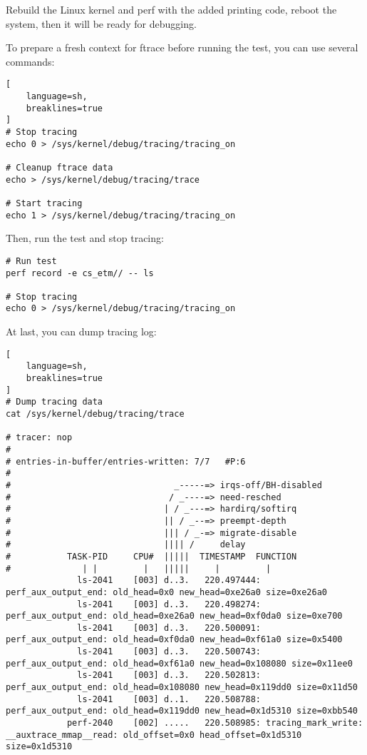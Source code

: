 \documentclass[11pt]{diazessay} %
\begin{document}
Rebuild the Linux kernel and perf with the added printing code, reboot the
system, then it will be ready for debugging.

To prepare a fresh context for ftrace before running the test, you can use
several commands:

\begin{lstlisting}[
  	language=sh,
	breaklines=true
]
# Stop tracing
echo 0 > /sys/kernel/debug/tracing/tracing_on

# Cleanup ftrace data
echo > /sys/kernel/debug/tracing/trace

# Start tracing
echo 1 > /sys/kernel/debug/tracing/tracing_on
\end{lstlisting}

Then, run the test and stop tracing:

\begin{lstlisting}
# Run test
perf record -e cs_etm// -- ls

# Stop tracing
echo 0 > /sys/kernel/debug/tracing/tracing_on
\end{lstlisting}

At last, you can dump tracing log:

\begin{lstlisting}[
  	language=sh,
	breaklines=true
]
# Dump tracing data
cat /sys/kernel/debug/tracing/trace

# tracer: nop
#
# entries-in-buffer/entries-written: 7/7   #P:6
#
#                                _-----=> irqs-off/BH-disabled
#                               / _----=> need-resched
#                              | / _---=> hardirq/softirq
#                              || / _--=> preempt-depth
#                              ||| / _-=> migrate-disable
#                              |||| /     delay
#           TASK-PID     CPU#  |||||  TIMESTAMP  FUNCTION
#              | |         |   |||||     |         |
              ls-2041    [003] d..3.   220.497444: perf_aux_output_end: old_head=0x0 new_head=0xe26a0 size=0xe26a0
              ls-2041    [003] d..3.   220.498274: perf_aux_output_end: old_head=0xe26a0 new_head=0xf0da0 size=0xe700
              ls-2041    [003] d..3.   220.500091: perf_aux_output_end: old_head=0xf0da0 new_head=0xf61a0 size=0x5400
              ls-2041    [003] d..3.   220.500743: perf_aux_output_end: old_head=0xf61a0 new_head=0x108080 size=0x11ee0
              ls-2041    [003] d..3.   220.502813: perf_aux_output_end: old_head=0x108080 new_head=0x119dd0 size=0x11d50
              ls-2041    [003] d..1.   220.508788: perf_aux_output_end: old_head=0x119dd0 new_head=0x1d5310 size=0xbb540
            perf-2040    [002] .....   220.508985: tracing_mark_write: __auxtrace_mmap__read: old_offset=0x0 head_offset=0x1d5310 size=0x1d5310
\end{lstlisting}
\end{document}
